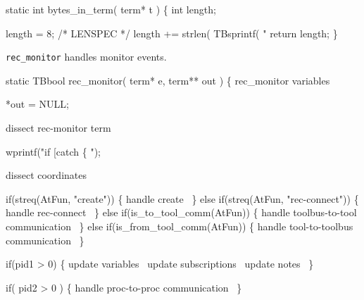 \nwenddocs{}\endmoddef\let\nwnotused=\nwoutput{}\nwstartdeflinemarkup{}\nwenddeflinemarkup
static int bytes_in_term( term* t )
\{ 
   int length;
   
   length = 8; /* LENSPEC */
   length += strlen( TBsprintf( "%
   return length;
\}
\nwendcode{}\nwdocspar


{\tt rec\_monitor} handles monitor events.

\nwenddocs{}\endmoddef\let\nwnotused=\nwoutput{}\nwstartdeflinemarkup{}\nwenddeflinemarkup
static TBbool rec_monitor( term* e, term** out )
\{
  \LA{}rec_monitor variables~{\nwtagstyle{}}\RA{}

  *out = NULL;

  \LA{}dissect rec-monitor term~{\nwtagstyle{}}\RA{}

  wprintf("if [catch \{ ");

  \LA{}dissect coordinates~{\nwtagstyle{}}\RA{}
   
   if(streq(AtFun, "create")) \{
     \LA{}handle create~{\nwtagstyle{}}\RA{}
   \} else  if(streq(AtFun, "rec-connect")) \{
     \LA{}handle rec-connect~{\nwtagstyle{}}\RA{}
   \}
   else if(is_to_tool_comm(AtFun)) \{
     \LA{}handle toolbus-to-tool communication~{\nwtagstyle{}}\RA{}
   \}
   else if(is_from_tool_comm(AtFun)) \{
     \LA{}handle tool-to-toolbus communication~{\nwtagstyle{}}\RA{}
   \}

   if(pid1 > 0) \{
     \LA{}update variables~{\nwtagstyle{}}\RA{}
     \LA{}update subscriptions~{\nwtagstyle{}}\RA{}
     \LA{}update notes~{\nwtagstyle{}}\RA{}
   \}
   
   if( pid2 > 0 ) \{
     \LA{}handle proc-to-proc communication~{\nwtagstyle{}}\RA{}
   \}
   
